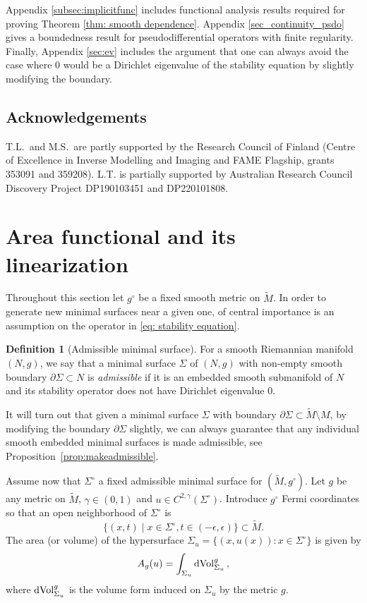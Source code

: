 \documentclass[11pt]{amsart}
\theoremstyle{definition}
\newtheorem{Definition}[Theorem]{Definition}
\numberwithin{equation}{section}
\begin{document}
Appendix \ref{subsec:implicitfunc} includes functional analysis results required for proving Theorem \ref{thm: smooth dependence}. Appendix \ref{sec_continuity_psdo} gives a boundedness result for pseudodifferential operators with finite regularity. Finally, Appendix \ref{sec:ev} includes the argument that one can always avoid the case where $0$ would be a Dirichlet eigenvalue of the stability equation by slightly modifying the boundary.

\subsection*{Acknowledgements}

T.L.\ and M.S.\ are partly supported by the Research Council of Finland (Centre of Excellence in Inverse Modelling and Imaging and FAME Flagship, grants 353091 and 359208). L.T. is partially supported by Australian Research Council Discovery Project DP190103451 and DP220101808.





\section{Area functional and its linearization} \label{sec_linearization}

Throughout this section let $g^\circ$ be a fixed smooth metric on $\widetilde{M}$. In order to generate new minimal surfaces near a given one, of central importance is an assumption on the operator in \eqref{eq: stability equation}. 
\begin{Definition}[Admissible minimal surface]\label{def:admis}
 	For a smooth Riemannian manifold $(N,g)$, we say that a minimal surface $\Sigma$ of $(N,g)$ with non-empty smooth boundary $\partial \Sigma\subset N$ is \emph{admissible} if it is an embedded smooth submanifold of $N$ and its stability operator does not have Dirichlet eigenvalue $0$. 
\end{Definition}
It will turn out that given a minimal surface $\Sigma$ with boundary $\partial \Sigma \subset \tilde M \setminus M$, by modifying the boundary $\partial \Sigma$ slightly, we can always guarantee that any individual smooth embedded minimal surfaces is made admissible, see Proposition~\ref{prop:makeadmissible}.

Assume now that $\Sigma^\circ$ a fixed admissible minimal surface for $(\widetilde{M},g^\circ)$. Let $g$ be any metric on $\widetilde{M}$, $\gamma \in (0,1)$ and $u\in C^{2,\gamma}(\Sigma^\circ)$. Introduce $g^\circ$ Fermi coordinates so that an open neighborhood of $\Sigma^\circ$ is
$$\{(x,t) \mid x\in \Sigma^\circ, t\in (-\epsilon, \epsilon)\}\subset \widetilde{M}.$$
The area (or volume) of the hypersurface $\Sigma_u = \{(x, u(x))\colon x \in \Sigma^\circ\}$ is given by
\begin{eqnarray}\label{eq: area formula}
A_{g}(u) = \int_{\Sigma_u} %
{\rm dVol}^{g}_{\Sigma_u}\,,
\end{eqnarray}
where ${\rm dVol}^{g}_{\Sigma_u}$ is the volume form induced on $\Sigma_u$ by the metric $g$.
\end{document}
